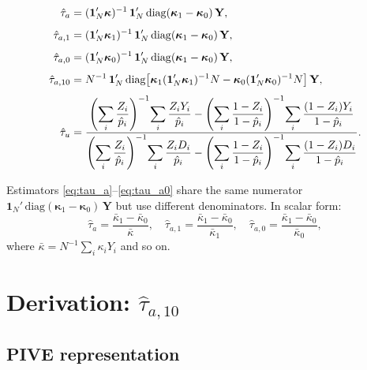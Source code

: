 \documentclass[12pt, a4paper]{article}
\theoremstyle{condstyle}
\theoremstyle{plain}
\newcommand{\bone}{\mathbf{1}_N}
\newcommand{\that}[1]{\hat{\tau}_{#1}}
\newcommand{\phat}{\hat{p}}
\begin{document}
\begin{align}
  \that{a}    &= (\bone'\boldsymbol{\kappa})^{-1}\,\bone'\,\mathrm{diag}(\boldsymbol{\kappa}_1 - \boldsymbol{\kappa}_0)\,\mathbf{Y},
  \label{eq:tau_a}\\[4pt]
  \that{a,1}  &= (\bone'\boldsymbol{\kappa}_1)^{-1}\,\bone'\,\mathrm{diag}(\boldsymbol{\kappa}_1 - \boldsymbol{\kappa}_0)\,\mathbf{Y},
  \label{eq:tau_a1}\\[4pt]
  \that{a,0}  &= (\bone'\boldsymbol{\kappa}_0)^{-1}\,\bone'\,\mathrm{diag}(\boldsymbol{\kappa}_1 - \boldsymbol{\kappa}_0)\,\mathbf{Y},
  \label{eq:tau_a0}\\[4pt]
  \that{a,10} &= N^{-1}\,\bone'\,\mathrm{diag}\!\left[\boldsymbol{\kappa}_1(\bone'\boldsymbol{\kappa}_1)^{-1}N
                  - \boldsymbol{\kappa}_0(\bone'\boldsymbol{\kappa}_0)^{-1}N\right]\mathbf{Y},
  \label{eq:tau_a10}\\[4pt]
  \that{u}    &= \frac{%
    \displaystyle\left(\sum_i \frac{Z_i}{\phat_i}\right)^{-1}\!\sum_i \frac{Z_i Y_i}{\phat_i}
    - \left(\sum_i \frac{1-Z_i}{1-\phat_i}\right)^{-1}\!\sum_i \frac{(1-Z_i)Y_i}{1-\phat_i}
  }{%
    \displaystyle\left(\sum_i \frac{Z_i}{\phat_i}\right)^{-1}\!\sum_i \frac{Z_i D_i}{\phat_i}
    - \left(\sum_i \frac{1-Z_i}{1-\phat_i}\right)^{-1}\!\sum_i \frac{(1-Z_i)D_i}{1-\phat_i}
  }.
  \label{eq:tau_u}
\end{align}

\noindent
Estimators \eqref{eq:tau_a}--\eqref{eq:tau_a0} share the same numerator
$\bone'\,\mathrm{diag}(\boldsymbol{\kappa}_1 - \boldsymbol{\kappa}_0)\,\mathbf{Y}$
but use different denominators. In scalar form:
\[
  \that{a}   = \frac{\bar\kappa_1 - \bar\kappa_0}{\bar\kappa},\quad
  \that{a,1} = \frac{\bar\kappa_1 - \bar\kappa_0}{\bar\kappa_1},\quad
  \that{a,0} = \frac{\bar\kappa_1 - \bar\kappa_0}{\bar\kappa_0},
\]
where $\bar\kappa = N^{-1}\sum_i \kappa_i Y_i$ and so on.

\section{Derivation: \texorpdfstring{$\hat\tau_{a,10}$}{tau\_a,10}}
\label{sec:a10}

\subsection{PIVE representation}
\end{document}
